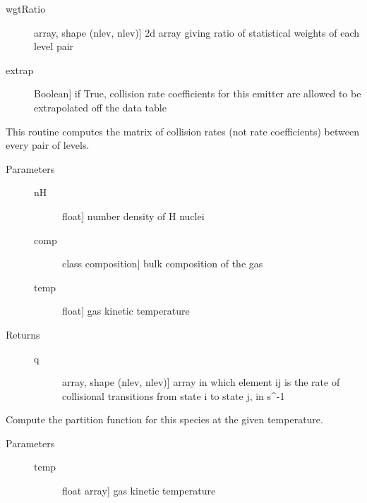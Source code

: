 \documentclass[letterpaper,10pt,english]{sphinxmanual}
\begin{document}
\begin{fulllineitems}
\begin{description}
\begin{description}
\item[{wgtRatio}] \leavevmode{[}array, shape (nlev, nlev){]}
2d array giving ratio of statistical weights of each level
pair

\item[{extrap}] \leavevmode{[}Boolean{]}
if True, collision rate coefficients for this emitter are
allowed to be extrapolated off the data table

\end{description}

\end{description}

\begin{fulllineitems}
\label{fulldoc:despotic.emitterData.collRateMatrix}
This routine computes the matrix of collision rates (not rate
coefficients) between every pair of levels.
\begin{description}
\item[{Parameters}] \leavevmode\begin{description}
\item[{nH}] \leavevmode{[}float{]}
number density of H nuclei

\item[{comp}] \leavevmode{[}class composition{]}
bulk composition of the gas

\item[{temp}] \leavevmode{[}float{]}
gas kinetic temperature

\end{description}

\item[{Returns}] \leavevmode\begin{description}
\item[{q}] \leavevmode{[}array, shape (nlev, nlev){]}
array in which element ij is the rate of collisional
transitions from state i to state j, in s\textasciicircum{}-1

\end{description}

\end{description}

\end{fulllineitems}


\begin{fulllineitems}
\label{fulldoc:despotic.emitterData.partFunc}
Compute the partition function for this species at the given
temperature.
\begin{description}
\item[{Parameters}] \leavevmode\begin{description}
\item[{temp}] \leavevmode{[}float \textbar{} array{]}
gas kinetic temperature


\end{description}
\end{description}
\end{fulllineitems}
\end{fulllineitems}
\end{document}
